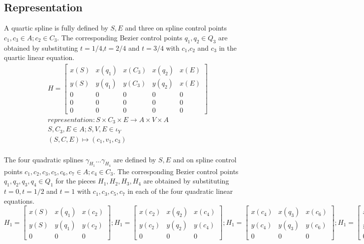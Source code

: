 \documentclass[a4paper,portrait]{report}
\begin{document}
\subsection{Representation}

A quartic spline is fully defined by $S,E$ and three on spline control points $c_{1},c_{3} \in A;c_{2} \in C_{3}$. The corresponding Bezier control points $q_{1},q_{2} \in Q_{3}$ are obtained by substituting $t=1/4$,$t=2/4$ and $t=3/4$ with $c_{1}$,$c_{2}$ and $c_{3}$ in the quartic linear equation.
\begin{align}
H=\begin{bmatrix}
x(S) & x(q_{1}) & x(C_{3}) & x(q_{2}) & x(E) \\
y(S) & y(q_{1}) & y(C_{3}) & y(q_{2}) & x(E) \\
0 & 0 & 0 & 0 & 0\\
0 & 0 & 0 & 0 & 0\\
0 & 0 & 0 & 0 & 0
\end{bmatrix}\\
representation: S \times C_{3} \times E \rightarrow A \times V \times A\\
S,C_{3},E \in A; S,V,E \in \iota_{Y}\\
(S,C,E)\mapsto(c_{1},v_{1},c_{3})
\end{align}\\
The four quadratic splines $\gamma_{H_{1}} ... \gamma_{H_{4}}$ are defined by $S,E$ and on spline control points $c_{1},c_{2},c_{3},c_{5},c_{6},c_{7} \in A;c_{4} \in C_{3}$. The corresponding Bezier control points $q_{1},q_{2},q_{3},q_{4} \in Q_{1}$ for the pieces $H_{1},H_{2},H_{3},H_{4}$ are obtained by substituting $t=0,t=1/2$ and $t=1$ with $c_{1},c_{3},c_{5},c_{7}$ in each of the four quadratic linear equations.
\begin{equation}
H_{1}=
\begin{bmatrix}
x(S) & x(q_{1}) & x(c_{2})\\
y(S) & y(q_{1}) & y(c_{2})\\
0 & 0 & 0
\end{bmatrix};
H_{1}=
\begin{bmatrix}
x(c_{2}) & x(q_{2}) & x(c_{4})\\
y(c_{2}) & y(q_{2}) & y(c_{4})\\
0 & 0 & 0
\end{bmatrix};
H_{1}=
\begin{bmatrix}
x(c_{4}) & x(q_{3}) & x(c_{6})\\
y(c_{4}) & y(q_{3}) & y(c_{6})\\
0 & 0 & 0
\end{bmatrix};
H_{1}=
\begin{bmatrix}
x(c_{6}) & x(q_{4}) & x(E)\\
y(c_{6}) & y(q_{4}) & y(E)\\
0 & 0 & 0
\end{bmatrix}
\end{equation}
\end{document}
